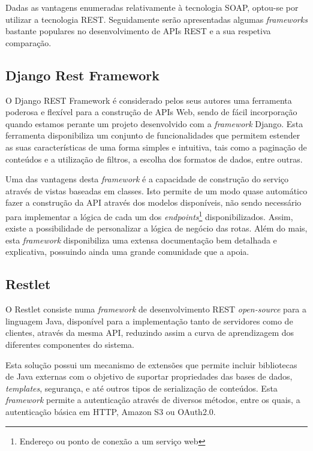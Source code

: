Dadas as vantagens enumeradas relativamente à tecnologia \ac{SOAP}, optou-se por utilizar a tecnologia \ac{REST}. Seguidamente serão apresentadas algumas \textit{frameworks} bastante populares no desenvolvimento de APIs \ac{REST} e a sua respetiva comparação. 

\subsection{Django Rest Framework}

O Django REST Framework é considerado pelos seus autores uma ferramenta poderosa e flexível para a construção de APIs Web\cite{restdjango}, sendo de fácil incorporação quando estamos perante um projeto desenvolvido com a \textit{framework} Django. Esta ferramenta disponibiliza um conjunto de funcionalidades que permitem estender as suas características de uma forma simples e intuitiva, tais como a paginação de conteúdos e a utilização de filtros, a escolha dos formatos de dados, entre outras.

Uma das vantagens desta \textit{framework} é a capacidade de construção do serviço através de vistas baseadas em classes. Isto permite de um modo quase automático fazer a construção da API através dos modelos disponíveis, não sendo necessário para implementar a lógica de cada um dos \textit{endpoints}\footnote{Endereço ou ponto de conexão a um serviço web} disponibilizados. Assim, existe a possibilidade de personalizar a lógica de negócio das rotas. Além do mais, esta \textit{framework} disponibiliza uma extensa documentação bem detalhada e explicativa, possuindo ainda uma grande comunidade que a apoia. 


\subsection{Restlet}

O Restlet consiste numa \textit{framework} de desenvolvimento \ac{REST} \textit{open-source} para a linguagem Java, disponível para a implementação tanto de servidores como de clientes, através da mesma \ac{API}, reduzindo assim a curva de aprendizagem dos diferentes componentes do sistema. 

Esta solução possui um mecanismo de extensões que permite incluir bibliotecas de Java externas com o objetivo de suportar propriedades das bases de dados, \textit{templates}, segurança, e até outros tipos de serialização de conteúdos. Esta \textit{framework} permite a autenticação através de diversos métodos, entre os quais, a autenticação básica em \ac{HTTP}, Amazon S3 ou OAuth2.0.


